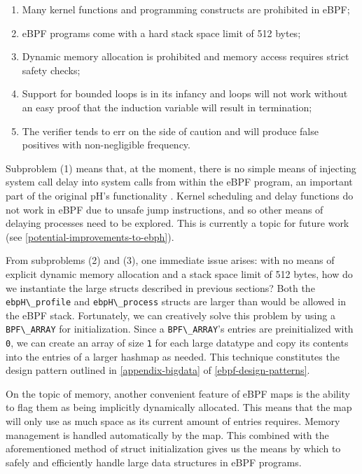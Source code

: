 \documentclass[
  12pt]{findlay}
\begin{document}
\begin{enumerate}
\def\labelenumi{(\arabic{enumi})}
\tightlist
\item
  Many kernel functions and programming constructs are prohibited in
  eBPF;
\item
  eBPF programs come with a hard stack space limit of 512 bytes;
\item
  Dynamic memory allocation is prohibited and memory access requires
  strict safety checks;
\item
  Support for bounded loops is in its infancy and loops will not work
  without an easy proof that the induction variable will result in
  termination;
\item
  The verifier tends to err on the side of caution and will produce
  false positives with non-negligible frequency.
\end{enumerate}

Subproblem (1) means that, at the moment, there is no simple means of
injecting system call delay into system calls from within the eBPF
program, an important part of the original pH's functionality
\autocite{soma02}. Kernel scheduling and delay functions do not work in
eBPF due to unsafe jump instructions, and so other means of delaying
processes need to be explored. This is currently a topic for future work
(see \autoref{potential-improvements-to-ebph}).

From subproblems (2) and (3), one immediate issue arises: with no means
of explicit dynamic memory allocation and a stack space limit of 512
bytes, how do we instantiate the large structs described in previous
sections? Both the \passthrough{\lstinline!ebpH\_profile!} and
\passthrough{\lstinline!ebpH\_process!} structs are larger than would be
allowed in the eBPF stack. Fortunately, we can creatively solve this
problem by using a \passthrough{\lstinline!BPF\_ARRAY!} for
initialization. Since a \passthrough{\lstinline!BPF\_ARRAY!}'s entries
are preinitialized with \passthrough{\lstinline!0!}, we can create an
array of size \passthrough{\lstinline!1!} for each large datatype and
copy its contents into the entries of a larger hashmap as needed. This
technique constitutes the design pattern outlined in
\autoref{appendix-bigdata} of \autoref{ebpf-design-patterns}.

On the topic of memory, another convenient feature of eBPF maps is the
ability to flag them as being implicitly dynamically allocated. This
means that the map will only use as much space as its current amount of
entries requires. Memory management is handled automatically by the map.
This combined with the aforementioned method of struct initialization
gives us the means by which to safely and efficiently handle large data
structures in eBPF programs.
\end{document}
